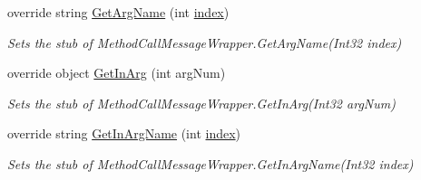 \begin{DoxyCompactItemize}
override string \hyperlink{class_system_1_1_runtime_1_1_remoting_1_1_messaging_1_1_fakes_1_1_stub_method_call_message_wrapper_ab073577bf59311de18ae6410d77227b0}{Get\-Arg\-Name} (int \hyperlink{jquery-1_810_82-vsdoc_8js_a75bb12d1f23302a9eea93a6d89d0193e}{index})
\begin{DoxyCompactList}\small\item\em Sets the stub of Method\-Call\-Message\-Wrapper.\-Get\-Arg\-Name(\-Int32 index)\end{DoxyCompactList}\item 
override object \hyperlink{class_system_1_1_runtime_1_1_remoting_1_1_messaging_1_1_fakes_1_1_stub_method_call_message_wrapper_a4666fc3c7fa60e0812fb12fa2a86adfe}{Get\-In\-Arg} (int arg\-Num)
\begin{DoxyCompactList}\small\item\em Sets the stub of Method\-Call\-Message\-Wrapper.\-Get\-In\-Arg(\-Int32 arg\-Num)\end{DoxyCompactList}\item 
override string \hyperlink{class_system_1_1_runtime_1_1_remoting_1_1_messaging_1_1_fakes_1_1_stub_method_call_message_wrapper_a7e3def409ec376ff3f62fa7477d2c7b5}{Get\-In\-Arg\-Name} (int \hyperlink{jquery-1_810_82-vsdoc_8js_a75bb12d1f23302a9eea93a6d89d0193e}{index})
\begin{DoxyCompactList}\small\item\em Sets the stub of Method\-Call\-Message\-Wrapper.\-Get\-In\-Arg\-Name(\-Int32 index)\end{DoxyCompactList}\end{DoxyCompactItemize}
